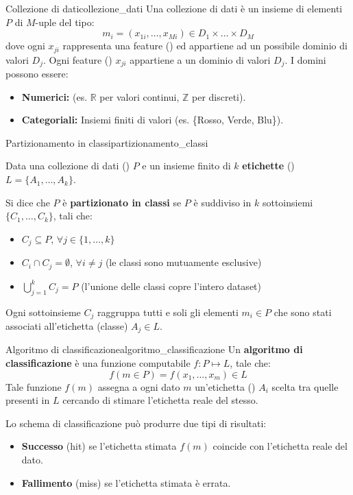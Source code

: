\begin{definizione}{Collezione di dati}{collezione_dati}
    Una collezione di dati è un insieme di elementi $P$ di $M$-uple
    del tipo:
    \[
    m_i = (x_{1i}, \ldots, x_{Mi}) \in D_1 \times \ldots \times D_M
    \]
    dove ogni $x_{ji}$ rappresenta una feature () ed appartiene ad un possibile
    dominio di valori $D_j$.
    Ogni feature () $x_{ji}$ appartiene a un dominio di valori $D_j$.
    I domini possono essere:
    \begin{itemize}
        \item \textbf{Numerici:} (es. $\mathbb{R}$ per valori continui,
        $\mathbb{Z}$ per discreti).
        \item \textbf{Categoriali:} Insiemi finiti di valori (es.
        \{Rosso, Verde, Blu\}).
    \end{itemize}
\end{definizione}

\begin{definizione}{Partizionamento in classi}{partizionamento_classi}

    Data una collezione di dati () $P$ e
    un insieme finito di $k$ \textbf{etichette} ()
    $L = \{A_1, \ldots, A_k\}$.

    Si dice che $P$ è \textbf{partizionato in classi} se $P$ è suddiviso in
    $k$ sottoinsiemi $\{C_1, \ldots, C_k\}$, tali che:
    \begin{itemize}
        \item $C_j \subseteq P$, $\forall j \in \{1, \ldots, k\}$
        \item $C_i \cap C_j = \emptyset$, $\forall i \neq j$ (le classi sono
        mutuamente esclusive)
        \item $\bigcup_{j=1}^k C_j = P$ (l'unione delle classi copre l'intero dataset)
    \end{itemize}
    
    Ogni sottoinsieme $C_j$ raggruppa tutti e soli gli elementi $m_i \in P$
    che sono stati associati all'etichetta (classe) $A_j \in L$.

\end{definizione}

\begin{definizione}{Algoritmo di classificazione}{algoritmo_classificazione}
    Un \textbf{algoritmo di classificazione} è una funzione computabile
    $f: P \mapsto L$, tale che:
    \[
    f(m \in P) = f(x_1, \ldots, x_m) \in L
    \]
    Tale funzione $f(m)$ assegna a ogni dato $m$ un'etichetta ()
    $A_i$ scelta tra quelle presenti in $L$ cercando di stimare
    l'etichetta reale del stesso.

    Lo schema di classificazione può produrre due tipi di risultati:
    \begin{itemize}
        \item \textbf{Successo} (hit) se l'etichetta stimata $f(m)$
        coincide con l'etichetta reale del dato.
        \item \textbf{Fallimento} (miss) se l'etichetta stimata è errata.
    \end{itemize}
\end{definizione}

